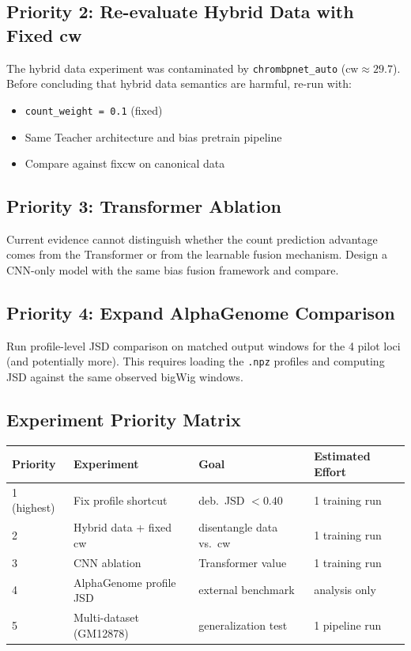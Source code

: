 \documentclass[11pt,a4paper]{article}
\begin{document}
\subsection{Priority 2: Re-evaluate Hybrid Data with Fixed cw}

The hybrid data experiment was contaminated by \texttt{chrombpnet\_auto} ($\text{cw} \approx 29.7$). Before concluding that hybrid data semantics are harmful, re-run with:
\begin{itemize}
\item \texttt{count\_weight = 0.1} (fixed)
\item Same Teacher architecture and bias pretrain pipeline
\item Compare against fixcw on canonical data
\end{itemize}

\subsection{Priority 3: Transformer Ablation}

Current evidence cannot distinguish whether the count prediction advantage comes from the Transformer or from the learnable fusion mechanism. Design a CNN-only model with the same bias fusion framework and compare.

\subsection{Priority 4: Expand AlphaGenome Comparison}

Run profile-level JSD comparison on matched output windows for the 4 pilot loci (and potentially more). This requires loading the \texttt{.npz} profiles and computing JSD against the same observed bigWig windows.

\subsection{Experiment Priority Matrix}

\begin{table}[h]
\centering
\begin{tabular}{l l l l}
\toprule
\textbf{Priority} & \textbf{Experiment} & \textbf{Goal} & \textbf{Estimated Effort} \\
\midrule
1 (highest) & Fix profile shortcut & deb.\ JSD $< 0.40$ & 1 training run \\
2 & Hybrid data + fixed cw & disentangle data vs.\ cw & 1 training run \\
3 & CNN ablation & Transformer value & 1 training run \\
4 & AlphaGenome profile JSD & external benchmark & analysis only \\
5 & Multi-dataset (GM12878) & generalization test & 1 pipeline run \\
\bottomrule
\end{tabular}
\end{table}
\end{document}
